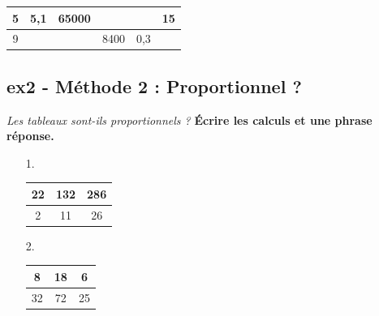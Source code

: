 \begin{center}
  \begin{tabular}{|c|c|c|c|c|c|}
    \hline
   5 &  5,1                   &                  65000 &  \phantom{100 000 000} &  \phantom{100 000 000} &                     15\\ \hline
   9 &  \phantom{100 000 000} &  \phantom{100 000 000} &                   8400 &                    0,3 &  \phantom{100 000 000}\\ \hline     
  \end{tabular}
\end{center}
\Pointilles[5]

\subsection*{ex2 - Méthode 2 : Proportionnel ?}
\textit{Les tableaux sont-ils proportionnels ? } \newline
\textbf{Écrire les calculs et une phrase réponse.}

\begin{minipage}[t]{0.2\textwidth}
  \begin{enumerate}
    \item[1.]
    \begin{tabular}{|c|c|c|}
      \hline
      22 & 132 & 286 \\  \hline
      2 & 11 & 26\\  \hline
    \end{tabular}
  \item[2.]
    \begin{tabular}{|c|c|c|}
      \hline
      8 & 18 & 6 \\  \hline
      32 & 72 & 25\\  \hline
    \end{tabular}
  \end{enumerate}
\end{minipage}
\begin{minipage}[t]{0.8\textwidth}
  \Pointilles[6]
\end{minipage}

